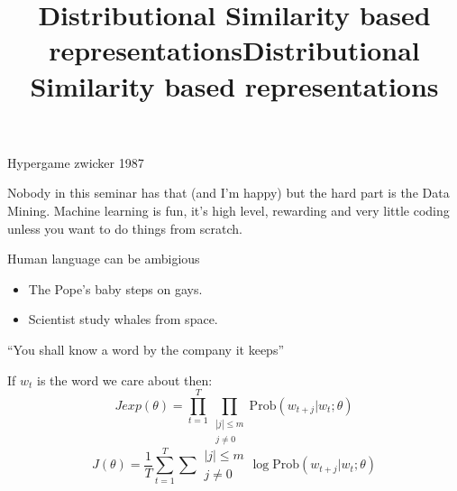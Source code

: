 \documentclass{beamer}
\newcommand{\Prob}{\text{Prob}}
\begin{document}
\begin{frame}
Hypergame zwicker 1987
\end{frame}

\begin{frame}
Nobody in this seminar has that (and I'm happy) but the hard part is the Data Mining.
Machine learning is fun, it's high level, rewarding and very little coding unless you want to do things from scratch.
\end{frame}

\begin{frame}
    Human language can be ambigious
    \begin{itemize}
            \item The Pope's baby steps on gays.
            \item Scientist study whales from space.
    \end{itemize}
\end{frame}

\begin{frame}
    \title{Distributional Similarity based representations}
    ``You shall know a word by the company it keeps''
\end{frame}

\begin{frame}
    \title{Distributional Similarity based representations}
    If $w_t$ is the word we care about then:
    $$Jexp(\theta) = \prod_{t=1}^T \prod_{\substack{|j|\leq m\\ j\neq 0}} \Prob(w_{t+j}| w_t; \theta)$$
    $$J(\theta) = \frac 1T \sum_{t=1}^T \sum{\substack{|j|\leq m\\ j\neq 0}}\log \Prob(w_{t+j}| w_t; \theta)$$
\end{frame}
\end{document}
